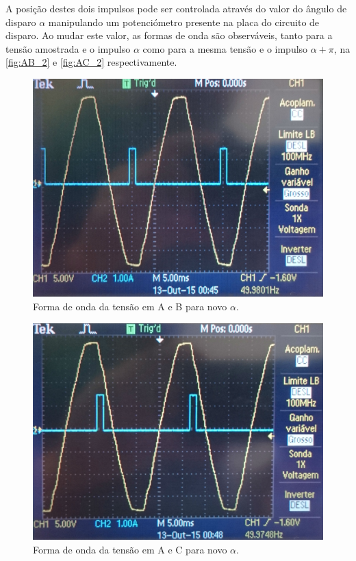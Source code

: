 \documentclass[a4paper,11pt]{article}
\numberwithin{equation}{section}
\begin{document}
A posição destes dois impulsos pode ser controlada através do valor do ângulo de disparo $\alpha$ manipulando um potenciómetro presente na placa do circuito de disparo. Ao mudar este valor, as formas de onda são observáveis, tanto para a tensão amostrada e o impulso $\alpha$ como para a mesma tensão e o impulso  $\alpha + \pi$, na \autoref{fig:AB_2} e \autoref{fig:AC_2} respectivamente.

\begin{figure}[H]
	\centering
	\includegraphics[keepaspectratio=true, scale=0.11]{img/figs/AB_2}
	\caption{Forma de onda da tensão em A e B para novo $\alpha$.}
	\label{fig:AB_2}
	\vspace{-0.8em}
\end{figure}

\begin{figure}[H]
	\centering
	\includegraphics[keepaspectratio=true, scale=0.11]{img/figs/AC_2}
	\caption{Forma de onda da tensão em A e C para novo $\alpha$.}
	\label{fig:AC_2}
	\vspace{-0.8em}
\end{figure}
\end{document}
